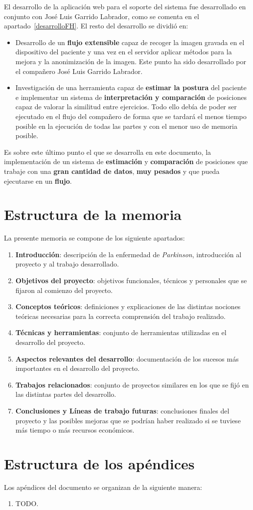 El desarrollo de la aplicación web para el soporte del sistema fue desarrollado en conjunto con José Luis Garrido Labrador, como se comenta en el apartado~\ref{desarrolloFH}. El resto del desarrollo se dividió en:
\begin{itemize}
	\item Desarrollo de un \textbf{flujo extensible} capaz de recoger la imagen gravada en el dispositivo del paciente y una vez en el servidor aplicar métodos para la mejora y la anonimización de la imagen. Este punto ha sido desarrollado por el compañero José Luis Garrido Labrador.
	\item Investigación de una herramienta capaz de \textbf{estimar la postura} del paciente e implementar un sistema de \textbf{interpretación y comparación} de posiciones capaz de valorar la similitud entre ejercicios. Todo ello debía de poder ser ejecutado en el flujo del compañero de forma que se tardará el menos tiempo posible en la ejecución de todas las partes y con el menor uso de memoria posible.
\end{itemize}

Es sobre este último punto el que se desarrolla en este documento, la implementación de un sistema de \textbf{estimación} y \textbf{comparación} de posiciones que trabaje con una \textbf{gran cantidad de datos}, \textbf{muy pesados} y que pueda ejecutarse en un \textbf{flujo}.

\section{Estructura de la memoria}
La presente memoria se compone de los siguiente apartados:
\begin{enumerate}
	\item \textbf{Introducción}: descripción de la enfermedad de \textit{Parkinson}, introducción al proyecto y al trabajo desarrollado.
	\item \textbf{Objetivos del proyecto}: objetivos funcionales, técnicos y personales que se fijaron al comienzo del proyecto.
	\item \textbf{Conceptos teóricos}: definiciones y explicaciones de las distintas nociones teóricas necesarias para la correcta comprensión del trabajo realizado.
	\item \textbf{Técnicas y herramientas}: conjunto de herramientas utilizadas en el desarrollo del proyecto.
	\item \textbf{Aspectos relevantes del desarrollo}: documentación de los sucesos más importantes en el desarrollo del proyecto.
	\item \textbf{Trabajos relacionados}: conjunto de proyectos similares en los que se fijó en las distintas partes del desarrollo.
	\item \textbf{Conclusiones y Líneas de trabajo futuras}: conclusiones finales del proyecto y las posibles mejoras que se podrían haber realizado si se tuviese más tiempo o más recursos económicos.
\end{enumerate}

\section{Estructura de los apéndices}
Los apéndices del documento se organizan de la siguiente manera:
\begin{enumerate}
	\item TODO.
\end{enumerate}

